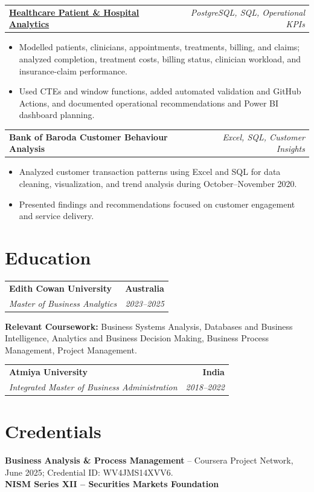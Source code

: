 \documentclass[letterpaper,10pt]{article}
\makeatletter
\newcommand{\role}[4]{%
  \begin{tabularx}{\textwidth}{@{}Xr@{}}
    \textbf{#1} & \textbf{#2} \\
    \textit{#3} & \textit{#4}
  \end{tabularx}\vspace{-1pt}
}
\newcommand{\project}[2]{%
  \begin{tabularx}{\textwidth}{@{}Xr@{}}
    \textbf{#1} & \textit{#2}
  \end{tabularx}\vspace{-1pt}
}
\makeatother
\begin{document}
\project{\href{https://github.com/jainalimehta/Healthcare-Analytics}{Healthcare Patient \& Hospital Analytics}}{PostgreSQL, SQL, Operational KPIs}
\begin{itemize}
  \item Modelled patients, clinicians, appointments, treatments, billing, and claims; analyzed completion, treatment costs, billing status, clinician workload, and insurance-claim performance.
  \item Used CTEs and window functions, added automated validation and GitHub Actions, and documented operational recommendations and Power BI dashboard planning.
\end{itemize}
\vspace{1pt}

\project{Bank of Baroda Customer Behaviour Analysis}{Excel, SQL, Customer Insights}
\begin{itemize}
  \item Analyzed customer transaction patterns using Excel and SQL for data cleaning, visualization, and trend analysis during October--November 2020.
  \item Presented findings and recommendations focused on customer engagement and service delivery.
\end{itemize}

\section{Education}
\role{Edith Cowan University}{Australia}{Master of Business Analytics}{2023--2025}
\small\textbf{Relevant Coursework:} Business Systems Analysis, Databases and Business Intelligence, Analytics and Business Decision Making, Business Process Management, Project Management.\\[2pt]
\role{Atmiya University}{India}{Integrated Master of Business Administration}{2018--2022}

\section{Credentials}
\small\textbf{Business Analysis \& Process Management} -- Coursera Project Network, June 2025; Credential ID: WV4JMS14XVV6.\\[-0.2pt]
\small\textbf{NISM Series XII -- Securities Markets Foundation}
\end{document}

